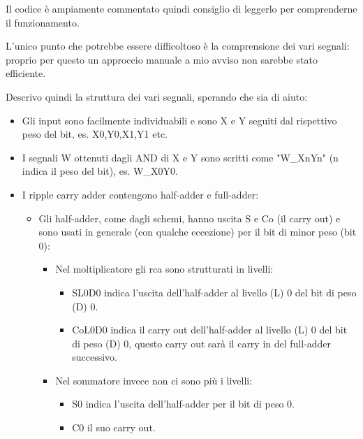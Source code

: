 \documentclass[12pt, letterpaper]{article}
\begin{document}
Il codice è ampiamente commentato quindi consiglio di leggerlo per comprenderne il funzionamento.

L'unico punto che potrebbe essere difficoltoso è la comprensione dei vari segnali: proprio per questo un approccio manuale a mio avviso non sarebbe stato efficiente.

Descrivo quindi la struttura dei vari segnali, sperando che sia di aiuto:

\begin{itemize}

\item Gli input sono facilmente individuabili e sono X e Y seguiti dal rispettivo peso del bit, es. X0,Y0,X1,Y1 etc.
\item I segnali W ottenuti dagli AND di X e Y sono scritti come "W\_XnYn" (n indica il peso del bit), es. W\_X0Y0.
\item I ripple carry adder contengono half-adder e full-adder:

\begin{itemize}

\item Gli half-adder, come dagli schemi, hanno uscita S e Co (il carry out) e sono usati in generale (con qualche eccezione) per il bit di minor peso (bit 0):
\begin{itemize}
\item Nel moltiplicatore gli rca sono strutturati in livelli:
\begin{itemize}
\item SL0D0 indica l'uscita dell'half-adder al livello (L) 0 del bit di peso (D) 0.
\item CoL0D0 indica il carry out dell'half-adder al livello (L) 0 del bit di peso (D) 0, questo carry out sarà il carry in del full-adder successivo.
\end{itemize}
\item Nel sommatore invece non ci sono più i livelli:
\begin{itemize} 
\item S0 indica l'uscita dell'half-adder per il bit di peso 0.
\item C0 il suo carry out.
\end{itemize}
\end{itemize}


\end{itemize}
\end{itemize}
\end{document}
